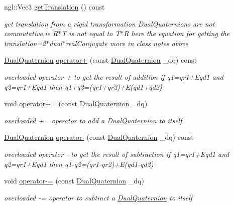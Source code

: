 \begin{DoxyCompactItemize}
ngl\-::\-Vec3 \hyperlink{class_dual_quaternion_a2b65019291107aaaabcab8e12ba394ee}{get\-Translation} () const 
\begin{DoxyCompactList}\small\item\em get translation from a rigid transformation Dual\-Quaternions are not commutative,ie R$\ast$\-T is not equal to T$\ast$\-R here the equation for getting the translation=2$\ast$dual$\ast$real\-Conjugate more in class notes above \end{DoxyCompactList}\item 
\hyperlink{class_dual_quaternion}{Dual\-Quaternion} \hyperlink{class_dual_quaternion_a3ec0af73f341db69ce5537940a0627df}{operator+} (const \hyperlink{class_dual_quaternion}{Dual\-Quaternion} \-\_\-dq) const 
\begin{DoxyCompactList}\small\item\em overloaded operator + to get the result of addition if q1=qr1+\-Eqd1 and q2=qr1+\-Eqd1 then q1+q2=(qr1+qr2)+\-E(qd1+qd2) \end{DoxyCompactList}\item 
void \hyperlink{class_dual_quaternion_af37ee1d741348be9064f3d22704d0876}{operator+=} (const \hyperlink{class_dual_quaternion}{Dual\-Quaternion} \-\_\-dq)
\begin{DoxyCompactList}\small\item\em overloaded += operator to add a \hyperlink{class_dual_quaternion}{Dual\-Quaternion} to itself \end{DoxyCompactList}\item 
\hyperlink{class_dual_quaternion}{Dual\-Quaternion} \hyperlink{class_dual_quaternion_accc2f631327326f3edb269ca21cbea40}{operator-\/} (const \hyperlink{class_dual_quaternion}{Dual\-Quaternion} \-\_\-dq) const 
\begin{DoxyCompactList}\small\item\em overloaded operator -\/ to get the result of subtraction if q1=qr1+\-Eqd1 and q2=qr1+\-Eqd1 then q1-\/q2=(qr1-\/qr2)+\-E(qd1-\/qd2) \end{DoxyCompactList}\item 
void \hyperlink{class_dual_quaternion_a64408fa2d0faa4b2be5b01de8e15b2b2}{operator-\/=} (const \hyperlink{class_dual_quaternion}{Dual\-Quaternion} \-\_\-dq)
\begin{DoxyCompactList}\small\item\em overloaded -\/= operator to subtract a \hyperlink{class_dual_quaternion}{Dual\-Quaternion} to itself \end{DoxyCompactList}\item 

\end{DoxyCompactItemize}
